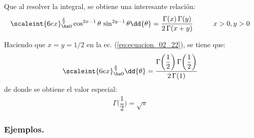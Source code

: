 Que al resolver la integral, se obtiene una interesante relación:
\begin{align}
\scaleint{6ex}_{\bs 0}^{\frac{\pi}{2}} \cos^{2x-1} \theta \, \sin^{2y-1} \theta \dd{\theta} = \dfrac{\Gamma (x) \, \Gamma(y)}{2 \, \Gamma(x + y)} \hspace{1cm} x > 0, y > 0
\label{eq:ecuacion_02_22}
\end{align}

Haciendo que $x =  y = 1/2$ en la ec. (\ref{eq:ecuacion_02_22}), se tiene que:
\begin{align*}
\scaleint{6ex}_{\bs 0}^{\frac{\pi}{2}} \dd{\theta} = \dfrac{\Gamma \bigg( \dfrac{1}{2} \bigg) \, \Gamma \bigg( \dfrac{1}{2} \bigg)}{2 \, \Gamma (1)}
\end{align*}
de donde se obtiene el valor especial:
\begin{align}
\Gamma \bigg( \dfrac{1}{2} \bigg) = \sqrt{\pi}
\label{eq:ecuacion_02_23}
\end{align}

\subsubsection{Ejemplos.}

